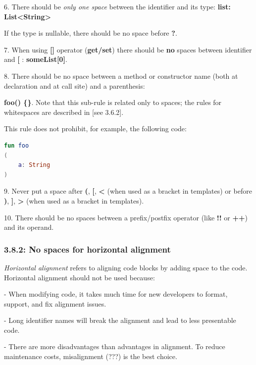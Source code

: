 6. There should be \textit{only one space} between the identifier and its type: \textbf{list: List<String>}

If the type is nullable, there should be no space before \textbf{?}.



7. When using \textbf{[]} operator (\textbf{get/set}) there should be \textbf{no} spaces between identifier and \textbf{[} : \textbf{someList[0]}.



8. There should be no space between a method or constructor name (both at declaration and at call site) and a parenthesis:

   \textbf{foo() \{\}}. Note that this sub-rule is related only to spaces; the rules for whitespaces are described in [see 3.6.2].

    This rule does not prohibit, for example, the following code:

\begin{lstlisting}[language=Kotlin]
fun foo
(
    a: String
)
\end{lstlisting}


9. Never put a space after \textbf{(}, \textbf{[}, \textbf{<} (when used as a bracket in templates) or before \textbf{)}, \textbf{]}, \textbf{>} (when used as a bracket in templates).



10. There should be no spaces between a prefix/postfix operator (like \textbf{!!} or \textbf{++}) and its operand.



\subsubsection*{\textbf{3.8.2: No spaces for horizontal alignment}}
\leavevmode\newline

\label{sec:3.8.2}



\textit{Horizontal alignment} refers to aligning code blocks by adding space to the code. Horizontal alignment should not be used because:



- When modifying code, it takes much time for new developers to format, support, and fix alignment issues.

- Long identifier names will break the alignment and lead to less presentable code.

- There are more disadvantages than advantages in alignment. To reduce maintenance costs, misalignment (???) is the best choice.



